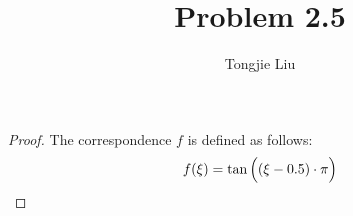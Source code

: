 \documentclass{article}
\title{Problem 2.5}
\author{Tongjie Liu}
\begin{document}
\maketitle


\begin{proof}
	The correspondence $f$ is defined as follows:
	\begin{equation*}
		f(\xi) = \tan \Big( (\xi - 0.5) \cdot \pi \Big) \qedhere
	\end{equation*}
\end{proof}
\end{document}

